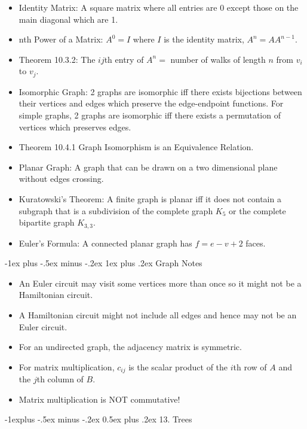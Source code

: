 \documentclass[10pt, portrait]{article}
\makeatletter
\renewcommand{\section}{\@startsection{section}{1}{0mm}%
                                {-1ex plus -.5ex minus -.2ex}%
                                {0.5ex plus .2ex}%
                                {\normalfont\large\bfseries}}
\renewcommand{\section}{\@startsection{section}{2}{0mm}%
                                {-1explus -.5ex minus -.2ex}%
                                {0.5ex plus .2ex}%
                                {\normalfont\normalsize\bfseries}}
\renewcommand{\subsection}{\@startsection{subsection}{3}{0mm}%
                                {-1ex plus -.5ex minus -.2ex}%
                                {1ex plus .2ex}%
                                {\normalfont\small\bfseries}}%
\makeatother
\begin{document}
\begin{multicols*}{2}
\begin{itemize}
    \item Identity Matrix: A square matrix where all entries are 0 except those on the main diagonal which are 1.
    \item nth Power of a Matrix: $A^0=I$ where $I$ is the identity matrix, $A^n=AA^{n-1}$.
    \item Theorem 10.3.2: The $ij$th entry of $A^n =$ number of walks of length $n$ from $v_i$ to $v_j$.
    \item Isomorphic Graph: 2 graphs are isomorphic iff there exists bijections between their vertices and edges which preserve the edge-endpoint functions. For simple graphs, 2 graphs are isomorphic iff there exists a permutation of vertices which preserves edges.
    \item Theorem 10.4.1 Graph Isomorphism is an Equivalence Relation.
    \item Planar Graph: A graph that can be drawn on a two dimensional plane without edges crossing.
    \item Kuratowski's Theorem: A finite graph is planar iff it does not contain a subgraph that is a subdivision of the complete graph $K_5$ or the complete bipartite graph $K_{3,3}$.
    \item Euler's Formula: A connected planar graph has $f=e-v+2$ faces.
\end{itemize}

\subsection{Graph Notes}
\begin{itemize}
    \item An Euler circuit may visit some vertices more than once so it might not be a Hamiltonian circuit.
    \item A Hamiltonian circuit might not include all edges and hence may not be an Euler circuit.
    \item For an undirected graph, the adjacency matrix is symmetric.
    \item For matrix multiplication, $c_{ij}$ is the scalar product of the $i$th row of $A$ and the $j$th column of $B$.
    \item Matrix multiplication is NOT commutative!
\end{itemize}

\section{13. Trees}

\end{multicols*}
\end{document}
